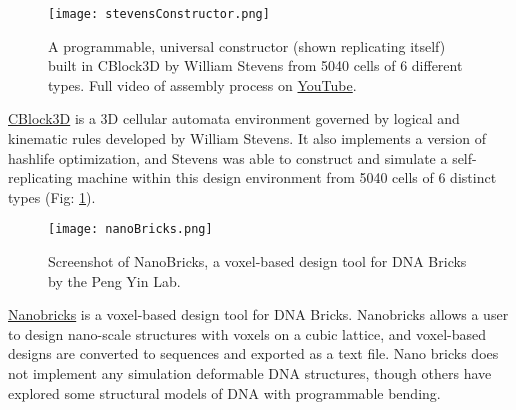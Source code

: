 {\begin{figure}
  \texttt{[image: stevensConstructor.png]}
  \caption{A programmable, universal constructor (shown replicating itself) built in CBlock3D by William Stevens from 5040 cells of 6 different types\cite{Stevens2009b}.  Full video of assembly process on  \href{https://www.youtube.com/watch?v=PBXO_6Jn1fs}{YouTube}.}
  \label{fig:stevensConstructor}
\end{figure}
\href{https://www.youtube.com/watch?feature=player_embedded&v=PBXO_6Jn1fs}{CBlock3D} is a 3D cellular automata environment governed by logical and kinematic rules developed by William Stevens\cite{Stevens2007}\cite{Stevens2009}.  It also implements a version of hashlife optimization\cite{Stevens2010}, and Stevens was able to construct and simulate a self-replicating machine within this design environment from 5040 cells of 6 distinct types (Fig: \ref{fig:stevensConstructor})\cite{Stevens2009b}.
\\

\begin{figure}
  \texttt{[image: nanoBricks.png]}
  \caption{Screenshot of NanoBricks, a voxel-based design tool for DNA Bricks by the Peng Yin Lab.}
  \label{fig:nanoBricks}
\end{figure}
\href{http://yin.hms.harvard.edu/bricks/try/}{Nanobricks} is a voxel-based design tool for DNA Bricks.  Nanobricks allows a user to design nano-scale structures with voxels on a cubic lattice, and voxel-based designs are converted to sequences and exported as a text file.  Nano bricks does not implement any simulation deformable DNA structures, though others have explored some structural models of DNA with programmable bending\cite{Dietz2009}\cite{Kim2012}.
\\

}
